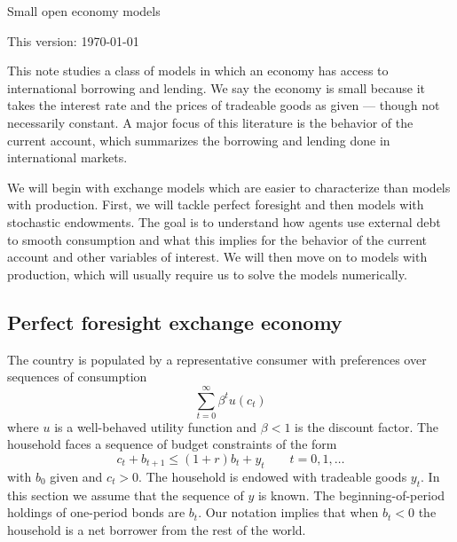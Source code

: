 \documentclass[11pt,pdftex,twoside,letterpaper]{exam}
\begin{document}
\centerline{\Large Small open economy models}%
\smallskip
\centerline{This version: \today}


This note studies a class of models in which an economy has access to international borrowing and lending. We say the economy is small because it takes the interest rate and the prices of tradeable goods as given --- though not necessarily constant. A major focus of this literature is the behavior of the current account, which summarizes the borrowing and lending done in international markets.

We will begin with exchange models which are easier to characterize than models with production. First, we will tackle perfect foresight and then models with stochastic endowments. The goal is to understand how agents use external debt to smooth consumption and what this implies for the behavior of the current account and other variables of interest. We will then move on to models with production, which will usually require us to solve the models numerically.

\setcounter{section}{1}
\subsection{Perfect foresight exchange economy}

The country is populated by a representative consumer with preferences over sequences of consumption
\begin{equation}\label{eq:prefs}
  \sum_{t=0}^{\infty}\beta^t u\left(c_t\right)
\end{equation}
where $u$ is a well-behaved utility function and $\beta<1$ is the discount factor. The household faces a sequence of budget constraints of the form
\begin{equation*}
  c_t+b_{t+1} \leq \left(1+r \right)b_t+y_t  \qquad t=0,1,\ldots
\end{equation*}
with $b_0$ given and $c_t>0$. The household is endowed with tradeable goods $y_t$. In this section we assume that the sequence of $y$ is known. The beginning-of-period holdings of one-period bonds are $b_t$. Our notation implies that when $b_t<0$  the household is a net borrower from the rest of the world.
\end{document}
